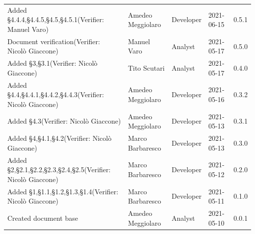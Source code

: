 \documentclass[a4paper]{article}
\begin{document}
\begin{center}
\begin{table}[h!]
\begin{tabular}{p{150px} p{90px} p{80px} p{60px} p{45px}}
            Added \S{4.4.4},\S{4.4.5},\S{4.5},\S{4.5.1}\newline(Verifier: Manuel Varo)             & Amedeo Meggiolaro & Developer     & 2021-06-15    & 0.5.1            \\
            Document verification\newline(Verifier: Nicolò Giaccone)                               & Manuel Varo       & Analyst       & 2021-05-17    & 0.5.0            \\
            Added \S{3},\S{3.1}\newline(Verifier: Nicolò Giaccone)                                 & Tito Scutari      & Analyst       & 2021-05-17    & 0.4.0            \\
            Added \S{4.4},\S{4.4.1},\S{4.4.2},\S{4.4.3}\newline(Verifier: Nicolò Giaccone)         & Amedeo Meggiolaro & Developer     & 2021-05-16    & 0.3.2            \\
            Added \S{4.3}\newline(Verifier: Nicolò Giaccone)                                       & Amedeo Meggiolaro & Developer     & 2021-05-13    & 0.3.1            \\
            Added \S{4},\S{4.1},\S{4.2}\newline(Verifier: Nicolò Giaccone)                         & Marco Barbaresco  & Developer     & 2021-05-13    & 0.3.0            \\
            Added \S{2},\S{2.1},\S{2.2},\S{2.3},\S{2.4},\S{2.5}\newline(Verifier: Nicolò Giaccone) & Marco Barbaresco  & Developer     & 2021-05-12    & 0.2.0            \\
            Added \S{1},\S{1.1},\S{1.2},\S{1.3},\S{1.4}\newline(Verifier: Nicolò Giaccone)         & Marco Barbaresco  & Developer     & 2021-05-11    & 0.1.0            \\
            Created document base                                                                  & Amedeo Meggiolaro & Analyst       & 2021-05-10    & 0.0.1            \\
        \end{tabular}
    \end{table}
\end{center}

\newpage
\tableofcontents
\newpage
\newpage
\listoffigures
\newpage
\newpage
\listoftables
\newpage






\end{document}
